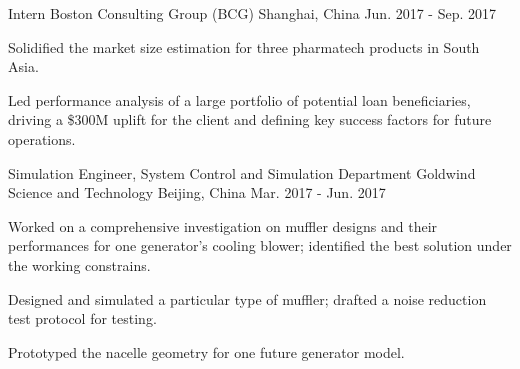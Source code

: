 \begin{cventries}
  \cventry
    {Intern} %
    {Boston Consulting Group (BCG)} %
    {Shanghai, China} %
    {Jun. 2017 - Sep. 2017} %
    {
      \begin{cvitems} %
        \item {Solidified the market size estimation for three pharmatech products in South Asia.}
        \item {Led performance analysis of a large portfolio of potential loan beneficiaries, driving a \$300M uplift for the client and defining key success factors for future operations.}
      \end{cvitems}
    }

  \cventry
    {Simulation Engineer, System Control and Simulation Department} %
    {Goldwind Science and Technology} %
    {Beijing, China} %
    {Mar. 2017 - Jun. 2017} %
    {
      \begin{cvitems} %
        \item {Worked on a comprehensive investigation on muffler designs and their performances for one generator’s cooling blower; identified the best solution under the working constrains.}
        \item {Designed and simulated a particular type of muffler; drafted a noise reduction test protocol for testing.}
        \item {Prototyped the nacelle geometry for one future generator model.}
      \end{cvitems}
    }



\end{cventries}
